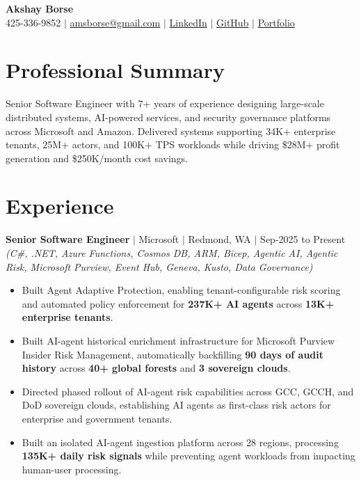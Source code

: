 \documentclass[10pt,letterpaper]{article}
\newcommand{\resumeItem}[1]{\item \small{#1}}
\newcommand{\role}[4]{
  \vspace{1.5pt}
  \textbf{#1} $|$ #2 $|$ #3 $|$ #4\\[-2pt]
}
\newcommand{\tech}[1]{\small\textit{(#1)}\vspace{1.5pt}}
\begin{document}
\begin{center}
    {\LARGE \textbf{Akshay Borse}}\\[2pt]
    \small
    425-336-9852 $|$ \href{mailto:amsborse@gmail.com}{amsborse@gmail.com} $|$ \href{https://linkedin.com/in/akshayborse}{LinkedIn} $|$ \href{https://github.com/amsborse}{GitHub} $|$ \href{https://amsborse.github.io}{Portfolio}
\end{center}
\vspace{-8pt}

\section{Professional Summary}
\small
Senior Software Engineer with 7+ years of experience designing large-scale distributed systems, AI-powered services, and security governance platforms across Microsoft and Amazon. Delivered systems supporting 34K+ enterprise tenants, 25M+ actors, and 100K+ TPS workloads while driving \$28M+ profit generation and \$250K/month cost savings.

\section{Experience}

\role{Senior Software Engineer}{Microsoft}{Redmond, WA}{Sep-2025 to Present}
\tech{C\#, .NET, Azure Functions, Cosmos DB, ARM, Bicep, Agentic AI, Agentic Risk, Microsoft Purview, Event Hub, Geneva, Kusto, Data Governance}
\begin{itemize}
    \resumeItem{Built Agent Adaptive Protection, enabling tenant-configurable risk scoring and automated policy enforcement for \textbf{237K+ AI agents} across \textbf{13K+ enterprise tenants}.}
    \resumeItem{Built AI-agent historical enrichment infrastructure for Microsoft Purview Insider Risk Management, automatically backfilling \textbf{90 days of audit history} across \textbf{40+ global forests} and \textbf{3 sovereign clouds}.}
    \resumeItem{Directed phased rollout of AI-agent risk capabilities across GCC, GCCH, and DoD sovereign clouds, establishing AI agents as first-class risk actors for enterprise and government tenants.}
    \resumeItem{Built an isolated AI-agent ingestion platform across 28 regions, processing \textbf{135K+ daily risk signals} while preventing agent workloads from impacting human-user processing.}
\end{itemize}
\end{document}

